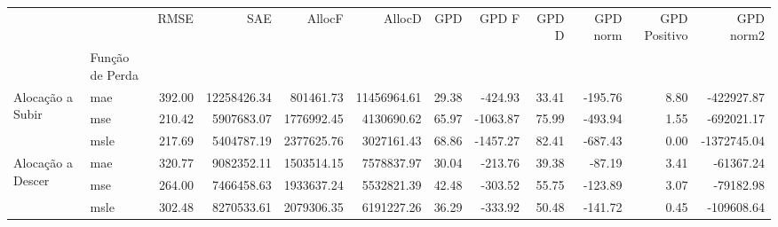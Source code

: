 \begin{tabular}{llrrrrrrrrrr}
\toprule
 &  & RMSE & SAE & AllocF & AllocD & GPD & GPD F & GPD D & GPD norm & GPD Positivo & GPD norm2 \\
 & Função de Perda &  &  &  &  &  &  &  &  &  &  \\
\midrule
\multirow[t]{3}{*}{Alocação a Subir} & mae & 392.00 & 12258426.34 & 801461.73 & 11456964.61 & 29.38 & -424.93 & 33.41 & -195.76 & 8.80 & -422927.87 \\
 & mse & 210.42 & 5907683.07 & 1776992.45 & 4130690.62 & 65.97 & -1063.87 & 75.99 & -493.94 & 1.55 & -692021.17 \\
 & msle & 217.69 & 5404787.19 & 2377625.76 & 3027161.43 & 68.86 & -1457.27 & 82.41 & -687.43 & 0.00 & -1372745.04 \\
\cline{1-12}
\multirow[t]{3}{*}{Alocação a Descer} & mae & 320.77 & 9082352.11 & 1503514.15 & 7578837.97 & 30.04 & -213.76 & 39.38 & -87.19 & 3.41 & -61367.24 \\
 & mse & 264.00 & 7466458.63 & 1933637.24 & 5532821.39 & 42.48 & -303.52 & 55.75 & -123.89 & 3.07 & -79182.98 \\
 & msle & 302.48 & 8270533.61 & 2079306.35 & 6191227.26 & 36.29 & -333.92 & 50.48 & -141.72 & 0.45 & -109608.64 \\
\cline{1-12}
\bottomrule
\end{tabular}
